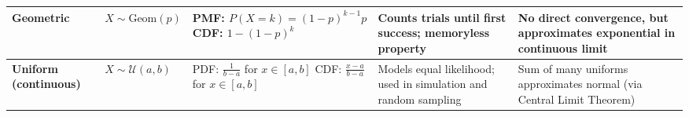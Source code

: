\documentclass[10pt]{article}
\begin{document}
\begin{longtable}{|>{\bfseries}m{2cm}|m{2.8cm}|p{4.5cm}|p{5.2cm}|p{4.5cm}|}
Geometric & $X \sim \mathrm{Geom}(p)$ & 
PMF: $P(X = k) = (1 - p)^{k - 1} p$ \newline CDF: $1 - (1-p)^k$ & 
Counts trials until first success; memoryless property & 
No direct convergence, but approximates exponential in continuous limit \\
\hline

Uniform (continuous) & $X \sim \mathcal{U}(a, b)$ & 
PDF: $\frac{1}{b - a}$ for $x \in [a, b]$ \newline
CDF: $\frac{x - a}{b - a}$ for $x \in [a, b]$ & 
Models equal likelihood; used in simulation and random sampling & 
Sum of many uniforms approximates normal (via Central Limit Theorem) \\
\hline

\end{longtable}
\end{document}
